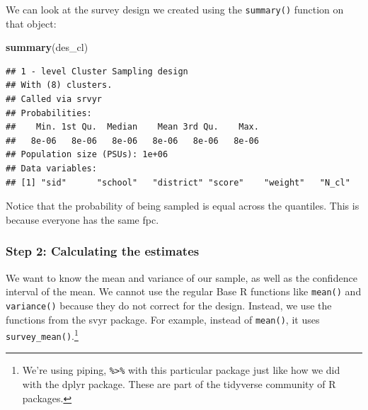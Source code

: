 \documentclass[
]{article}
\newenvironment{Shaded}{\begin{snugshade}}{\end{snugshade}}
\newcommand{\DataTypeTok}[1]{\textcolor[rgb]{0.13,0.29,0.53}{#1}}
\newcommand{\KeywordTok}[1]{\textcolor[rgb]{0.13,0.29,0.53}{\textbf{#1}}}
\newcommand{\NormalTok}[1]{#1}
\newcommand{\OperatorTok}[1]{\textcolor[rgb]{0.81,0.36,0.00}{\textbf{#1}}}
\newcommand{\OtherTok}[1]{\textcolor[rgb]{0.56,0.35,0.01}{#1}}
\newcommand{\StringTok}[1]{\textcolor[rgb]{0.31,0.60,0.02}{#1}}
\begin{document}
We can look at the survey design we created using the \texttt{summary()} function on that object:

\begin{Shaded}
\begin{Highlighting}[]
\KeywordTok{summary}\NormalTok{(des_cl) }
\end{Highlighting}
\end{Shaded}

\begin{verbatim}
## 1 - level Cluster Sampling design
## With (8) clusters.
## Called via srvyr
## Probabilities:
##    Min. 1st Qu.  Median    Mean 3rd Qu.    Max. 
##   8e-06   8e-06   8e-06   8e-06   8e-06   8e-06 
## Population size (PSUs): 1e+06 
## Data variables:
## [1] "sid"      "school"   "district" "score"    "weight"   "N_cl"
\end{verbatim}

Notice that the probability of being sampled is equal across the quantiles. This is because everyone has the same fpc.

\hypertarget{step-2-calculating-the-estimates}{%
\subsubsection{Step 2: Calculating the estimates}\label{step-2-calculating-the-estimates}}

We want to know the mean and variance of our sample, as well as the confidence interval of the mean. We cannot use the regular Base R functions like \texttt{mean()} and \texttt{variance()} because they do not correct for the design. Instead, we use the functions from the svyr package. For example, instead of \texttt{mean()}, it uses \texttt{survey\_mean()}.\footnote{We're using piping, \texttt{\%\textgreater{}\%} with this particular package just like how we did with the dplyr package. These are part of the tidyverse community of R packages.}

\begin{Shaded}
\end{Shaded}
\end{document}
